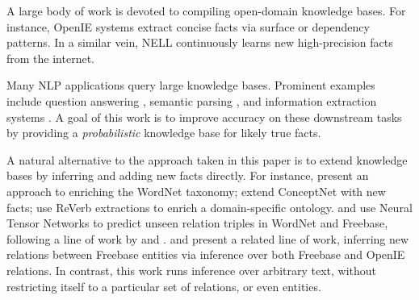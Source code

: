 A large body of work is devoted to compiling open-domain knowledge
  bases.
For instance, OpenIE systems
  \cite{key:2007yates-textrunner,key:2011fader-reverb}
  extract concise facts via surface or dependency patterns.
In a similar vein, NELL \cite{key:2010carlson-nell,key:2013gardnerpra-nell}
  continuously learns new high-precision facts from the internet.

Many NLP applications query large knowledge bases.
Prominent examples include
  question answering
    \cite{key:2001voorhees-trec},
  semantic parsing
    \cite{key:1996zelle-semantics,key:2007zettlemoyer-semantics,key:2013kwiatkowski-semantics,key:2014berant-semantics},
  and information extraction systems
    \cite{key:2011hoffman-kbp,key:2012surdeanu-mimlre}.
A goal of this work is to improve accuracy on these
  downstream tasks by providing a \textit{probabilistic} knowledge base
  for
  likely true facts.

A natural alternative to the approach taken in this paper is to
  extend knowledge bases by inferring and adding new facts directly.
For instance,
   present an approach to enriching 
    the WordNet taxonomy;
   extend ConceptNet with new facts;
   use ReVerb extractions to 
    enrich a domain-specific ontology.
 and 
  use Neural Tensor Networks to predict unseen relation triples in
  WordNet and Freebase, following a line of work by
   and
  .
 and 
  present a related line of work, inferring new relations between
  Freebase entities via inference over both Freebase and
  OpenIE relations.
In contrast, this work runs inference over arbitrary text, without 
  restricting itself to a particular set of relations, or even entities.


